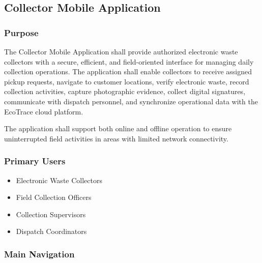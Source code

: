 \subsection{Collector Mobile Application}

\subsubsection*{Purpose}

The Collector Mobile Application shall provide authorized electronic
waste collectors with a secure, efficient, and field-oriented interface
for managing daily collection operations. The application shall enable
collectors to receive assigned pickup requests, navigate to customer
locations, verify electronic waste, record collection activities,
capture photographic evidence, collect digital signatures, communicate
with dispatch personnel, and synchronize operational data with the
EcoTrace cloud platform.

The application shall support both online and offline operation to
ensure uninterrupted field activities in areas with limited network
connectivity.


\subsubsection*{Primary Users}

\begin{itemize}

\item Electronic Waste Collectors

\item Field Collection Officers

\item Collection Supervisors

\item Dispatch Coordinators

\end{itemize}


\subsubsection*{Main Navigation}

